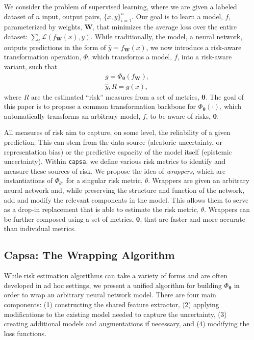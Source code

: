 \documentclass{article} %
\def\capsa{\texttt{{capsa}}}
\begin{document}
We consider the problem of supervised learning, where we are given a labeled dataset of $n$ input, output pairs, $\{x, y\}_{i=1}^n$. Our goal is to learn a model, $f$, parameterized by weights, $\bm{W}$, that minimizes the average loss over the entire dataset: $\sum_i \mathcal{L}(f_{\bm{W}}(x), y)$. While traditionally, the model, a neural network, outputs predictions in the form of $\hat y = f_{\bm{W}}(x)$, we now introduce a risk-aware transformation operation, $\Phi$, which transforms a model, $f$, into a risk-aware variant, such that
%
\begin{align*}
g = \Phi_{\bm \theta}(f_{\bm W}),\\
\hat y, R = g (x),
\end{align*}
%
%
where $R$ are the estimated ``risk'' measures from a set of metrics, $\bm \theta$. The goal of this paper is to propose a common transformation backbone for $\Phi_{\bm \theta}(\cdot)$, which automatically transforms an arbitrary model, $f$, to be aware of risks, $\bm \theta$.

All measures of risk aim to capture, on some level, the reliability of a given prediction. This can stem from the data source (aleatoric uncertainty, or representation bias) or the predictive capacity of the model itself (epistemic uncertainty). Within \capsa, we define various risk metrics to identify and measure these sources of risk. We propose the idea of \textit{wrappers}, which are instantiations of $\Phi_\theta$, for a singular risk metric, $\theta$. Wrappers are given an arbitrary neural network and, while preserving the structure and function of the network, add and modify the relevant components in the model. This allows them to serve as a drop-in replacement that is able to estimate the risk metric, $\theta$. Wrappers can be further composed using a set of metrics, $\bm \theta$, that are faster and more accurate than individual metrics. 

\subsection{Capsa: The Wrapping Algorithm}

While risk estimation algorithms can take a variety of forms and are often developed in ad hoc settings, we present a unified algorithm for building $\Phi_{\bm \theta}$ in order to wrap an arbitrary neural network model. There are four main components: (1) constructing the shared feature extractor, (2) applying modifications to the existing model needed to capture the uncertainty, (3) creating additional models and augmentations if necessary, and (4) modifying the loss functions. 
\end{document}
